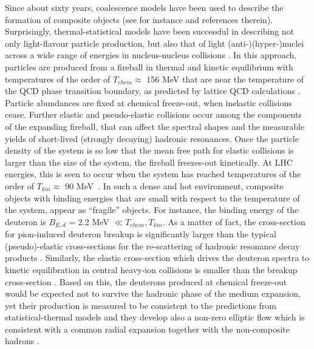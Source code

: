 \documentclass[a4paper,11pt]{scrartcl}
\begin{document}
Since about sixty years, coalescence models have been used to describe the formation of composite objects (see for instance \cite{Butler:1963, Kapusta:1980, Sato:1981ez, Nagle:1996vp, Scheibl:1998tk, Cho:2017dcy, Blum:2017qnn, Bazak:2018hgl, Zhao:2018lyf} and references therein).
Surprisingly, thermal-statistical models have been successful in describing not only light-flavour particle production, but also that of light (anti-)(hyper-)nuclei across a wide range of energies in nucleus-nucleus collisions \cite{Andronic:2017, Andronic:2010qu}. 
In this approach, particles are produced from a fireball in thermal and kinetic equilibrium with temperatures of the order of $T_{chem} \approx$ 156 MeV that are near the temperature of the QCD phase transition boundary, as predicted by lattice QCD calculations \cite{Bazavov:2014pvz,Bellwied:2013cta}. Particle abundances are fixed at chemical freeze-out, when inelastic collisions cease. Further elastic and pseudo-elastic collisions occur among the components of the expanding fireball, that can affect the spectral shapes and the measurable yields of short-lived (strongly decaying) hadronic resonances. Once the particle density of the system is so low that the mean free path for elastic collisions is larger than the size of the system, the fireball freezes-out kinetically. At LHC energies, this is seen to occur when the system has reached temperatures of the order of $T_{kin} \approx$ 90 MeV~\cite{Abelev:2013vea}. 
In such a dense and hot environment, composite objects with binding energies that are small with respect to the temperature of the system, appear as ``fragile'' objects. For instance, the binding energy of the deuteron is $B_{E, d}$ = 2.2 MeV $\ll T_{chem}, T_{kin}$.
As a matter of fact, the cross-section for pion-induced deuteron breakup is significantly larger than the typical (pseudo)-elastic cross-sections for the re-scattering of hadronic resonance decay products \cite{Garcilazo:1982yc, Bass:1998ca, Schukraft:2017nbn}. 
Similarly, the elastic cross-section which drives the deuteron spectra to kinetic equilibration in central heavy-ion collisions \cite{Acharya:2017dmc} is smaller than the breakup cross-section \cite{Garcilazo:1982yc, Bass:1998ca, Schukraft:2017nbn}.   
Based on this, the deuterons produced at chemical freeze-out would be expected not to survive the hadronic phase of the medium expansion, yet their production is measured to be consistent to the predictions from statistical-thermal models and they develop also a non-zero elliptic flow which is consistent with a common radial expansion together with the non-composite hadrons \cite{Acharya:2017dmc}. 
\end{document}
